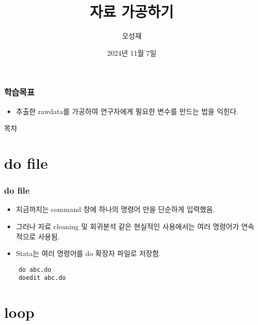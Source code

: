 \documentclass[aspectratio=169,xcolor=dvipsnames,handout]{beamer}
\title{자료 가공하기}
\author{오성재}
\institute[CNU]
{\relax
    전북대학교 Stata 특강\
}
\date{2024년 11월 7일}
\begin{document}

\frame{\titlepage}

\begin{frame}
\frametitle{학습목표}
    \begin{itemize}[<+->]
    \item 추출한 rawdata를 가공하여 연구자에게 필요한 변수를 만드는 법을 익힌다.
    \end{itemize}
\end{frame}

\begin{frame}{목차}
    \small
    \tableofcontents[hideallsubsections]
\end{frame}

\section{do file}

\begin{frame}[fragile]
    \frametitle{do file}
    \begin{itemize}[<+->]
        \item 지금까지는 command 창에 하나의 명령어 만을 단순하게 입력했음.
        \item 그러나 자료 cleaning 및 회귀분석 같은 현실적인 사용에서는 여러 명령어가 연속적으로 사용됨.
        \item Stata는 여러 명령어를 do 확장자 파일로 저장함.
    \end{itemize}
    \begin{verbatim}
    do abc.do
    doedit abc.do
    \end{verbatim}
\end{frame}

\section{loop}
\end{document}
